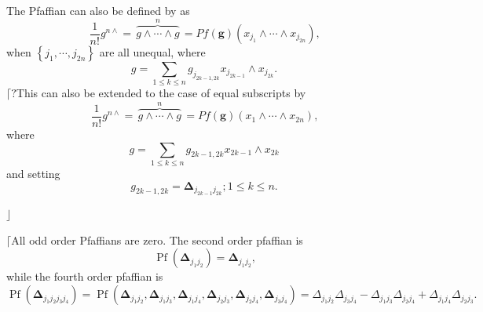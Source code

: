 \documentclass[aps, preprint]{revtex4}
\begin{document}
The Pfaffian can also be defined by as
\begin{equation}\frac{1}{n !} g^{n \wedge } =\,\overset{n}{\overbrace{g \wedge \cdots  \wedge g}}\, =P f \left (\mathbf{g}\right ) \left (x_{j_{1}} \wedge \cdots  \wedge x_{j_{2 n}}\right )\text{,}
\end{equation}when $\left \{j_{1} ,\cdots  ,j_{2 n}\right \}$ are all unequal, where
\begin{equation}g ={\displaystyle\sum _{1 \leq k \leq n}}g_{j_{2 k -1 ,2 k}} x_{j_{2 k -1}} \wedge x_{j_{2 k}}\text{.}
\end{equation}$\lceil \text{?}$This can also be extended to the case of equal subscripts by
\begin{equation}\frac{1}{n !} g^{n \wedge } =\,\overset{n}{\overbrace{g \wedge \cdots  \wedge g}}\, =P f \left (\mathbf{g}\right ) \left (x_{1} \wedge \cdots  \wedge x_{2 n}\right )\text{,}
\end{equation}where
\begin{equation}g ={\displaystyle\sum _{1 \leq k \leq n}}g_{2 k -1 ,2 k} x_{2 k -1} \wedge x_{2 k}
\end{equation}and setting
\begin{equation}g_{2 k -1 ,2 k} =\mathbf{\Delta }_{j_{2 k -1} j_{2 k}} ;1 \leq k \leq n\text{.}
\end{equation}

$\rfloor $ 

$\lceil $All odd order Pfaffians are zero. The second order pfaffian is
\begin{equation}\ensuremath{\operatorname*{Pf}} \left (\mathbf{\Delta }_{j_{1} j_{2}}\right ) =\mathbf{\Delta }_{j_{1} j_{2}}\text{,}
\end{equation}while the fourth order pfaffian is
\begin{equation}\ensuremath{\operatorname*{Pf}} \left (\mathbf{\Delta }_{j_{1} j_{2} j_{3} j_{4}}\right ) =\ensuremath{\operatorname*{Pf}} \left (\mathbf{\Delta }_{j_{1} j_{2}} ,\mathbf{\Delta }_{j_{1} j_{3}} ,\mathbf{\Delta }_{j_{1} j_{4}} ,\mathbf{\Delta }_{j_{2} j_{3}} ,\mathbf{\Delta }_{j_{2} j_{4}} ,\mathbf{\Delta }_{j_{3} j_{4}}\right ) = \Delta _{j_{1} j_{2}} \Delta _{j_{3} j_{4}} -  \Delta _{j_{1} j_{3}} \Delta _{j_{2} j_{4}} +  \Delta _{j_{1} j_{4}} \Delta _{j_{2} j_{3}}\text{.}
\end{equation}
\end{document}
